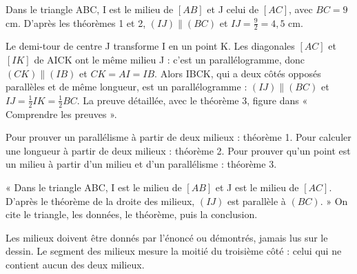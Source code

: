 \begin{exemple}Dans le triangle ABC, I est le milieu de $[AB]$ et J celui de $[AC]$, avec $BC=9$ cm. D’après les théorèmes 1 et 2, $(IJ)\parallel(BC)$ et $IJ=\frac92=4{,}5$ cm.\end{exemple}
\clearpage
{}\label{cours-14-2}
\begin{demonstration}Le demi-tour de centre J transforme I en un point K. Les diagonales $[AC]$ et $[IK]$ de AICK ont le même milieu J : c’est un parallélogramme, donc $(CK)\parallel(IB)$ et $CK=AI=IB$. Alors IBCK, qui a deux côtés opposés parallèles et de même longueur, est un parallélogramme : $(IJ)\parallel(BC)$ et $IJ=\frac12IK=\frac12BC$. La preuve détaillée, avec le théorème 3, figure dans « Comprendre les preuves ».\end{demonstration}
\begin{savoirfaire}Pour prouver un parallélisme à partir de deux milieux : théorème 1. Pour calculer une longueur à partir de deux milieux : théorème 2. Pour prouver qu’un point est un milieu à partir d’un milieu et d’un parallélisme : théorème 3.\end{savoirfaire}
\begin{savoirfaire}[Rédiger]« Dans le triangle ABC, I est le milieu de $[AB]$ et J est le milieu de $[AC]$. D’après le théorème de la droite des milieux, $(IJ)$ est parallèle à $(BC)$. » On cite le triangle, les données, le théorème, puis la conclusion.\end{savoirfaire}
\begin{attention}Les milieux doivent être donnés par l’énoncé ou démontrés, jamais lus sur le dessin. Le segment des milieux mesure la moitié du troisième côté : celui qui ne contient aucun des deux milieux.\end{attention}

